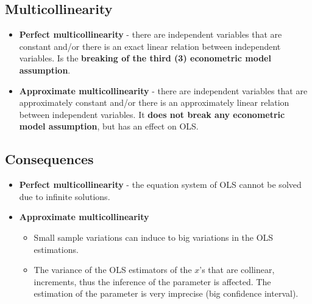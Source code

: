 \documentclass[10pt, a4paper, landscape]{extarticle}
\begin{document}
\begin{multicols}{3}
\columnbreak

\section*{Multicollinearity}
	\begin{itemize}[leftmargin=*]
		\item \textbf{Perfect multicollinearity} - there are independent variables that are constant and/or there is an exact linear relation between independent variables. Is the \textbf{breaking of the third (3) econometric model assumption}.
		\item \textbf{Approximate multicollinearity} - there are independent variables that are approximately constant and/or there is an approximately linear relation between independent variables. It \textbf{does not break any econometric model assumption}, but has an effect on OLS.
	\end{itemize}
	\subsection*{Consequences}
		\begin{itemize}[leftmargin=*]
			\item \textbf{Perfect multicollinearity} - the equation system of OLS cannot be solved due to infinite solutions.
			\item \textbf{Approximate multicollinearity}
			\begin{itemize}[leftmargin=*]
				\item Small sample variations can induce to big variations in the OLS estimations.
				\item The variance of the OLS estimators of the $x$'s that are collinear, increments, thus the inference of the parameter is affected. The estimation of the parameter is very imprecise (big confidence interval).
			\end{itemize}
		\end{itemize}

\end{multicols}
\end{document}
